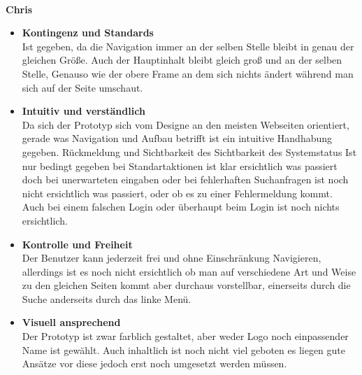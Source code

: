 \documentclass[parskip,10pt,abstracton]{scrartcl}
\begin{document}
\hrulefill\\
\textbf{Chris}\\
\begin{itemize}
\item \textbf{Kontingenz und Standards}\\    
Ist gegeben, da die Navigation immer an der selben Stelle bleibt in genau der gleichen Größe.
Auch der Hauptinhalt bleibt gleich groß und an der selben Stelle,
Genauso wie der obere Frame an dem sich nichts ändert während man sich auf der Seite umschaut.

\item \textbf{Intuitiv und verständlich}\\  
Da sich der Prototyp sich vom Designe an den meisten Webseiten orientiert, gerade was Navigation und Aufbau betrifft ist ein intuitive Handhabung gegeben.
Rückmeldung und Sichtbarkeit des Sichtbarkeit des Systemstatus
Ist nur bedingt gegeben bei Standartaktionen ist klar ersichtlich was passiert doch bei unerwarteten eingaben oder bei fehlerhaften Suchanfragen ist noch nicht ersichtlich was passiert, oder ob es zu einer Fehlermeldung kommt.
Auch bei einem falschen Login oder überhaupt beim Login ist noch nichts ersichtlich.

\item \textbf{Kontrolle und Freiheit}\\ 
Der Benutzer kann jederzeit frei und ohne Einschränkung Navigieren, allerdings ist es noch nicht ersichtlich ob man auf verschiedene Art und Weise zu den gleichen Seiten kommt aber durchaus vorstellbar, einerseits durch die Suche anderseits durch das linke Menü.

\item \textbf{Visuell ansprechend}\\ 
Der Prototyp ist zwar farblich gestaltet, aber weder Logo noch einpassender Name ist gewählt.
Auch inhaltlich ist noch nicht viel geboten es liegen gute Ansätze vor diese jedoch erst noch umgesetzt werden müssen.
\end{itemize}
\hrulefill\\
\end{document}
